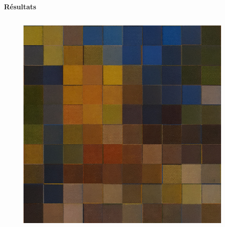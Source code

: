 \documentclass{beamer}
\begin{document}
\begin{frame}[t]
\begin{columns}[t]
\begin{column}{.5\linewidth}
\begin{block}{\centering \textbf{Résultats}}
\begin{columns}[t]
                        \begin{column}{.2\linewidth}
                            \begin{figure}[t]
                                \includegraphics[width=\linewidth]{rsc/van_gogh_picture_a_10_d.png}\\
                            \end{figure}
                        \end{column}

                        \begin{column}{.005\linewidth}

                        \end{column}


\end{columns}
\end{block}
\end{column}
\end{columns}
\end{frame}
\end{document}
